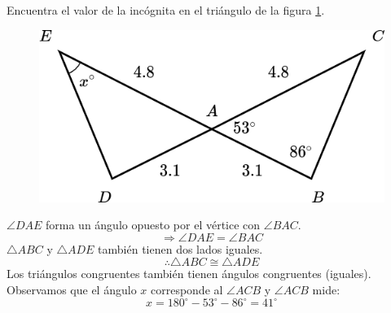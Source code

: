 Encuentra el valor de la incógnita en el triángulo de la figura \ref{fig:angle_triangle_31}.

\begin{minipage}[t][5.5cm][b]{0.3\textwidth}
    \begin{figure}[H]
        \centering
        \includegraphics[width=1\linewidth]{../images/angle_triangle_31.png}
        \caption{}
        \label{fig:angle_triangle_31}
    \end{figure}
\end{minipage}\hfill
\begin{minipage}[t]{0.65\textwidth}
    \begin{solutionbox}{5.5cm}
        $\angle DAE$ forma un ángulo opuesto por el vértice con $\angle BAC$.
        \[\Rightarrow \angle DAE = \angle BAC \]
        $\triangle ABC$ y $\triangle ADE$ también tienen dos lados iguales.
        \[\therefore \triangle ABC \cong \triangle ADE\]
        Los triángulos congruentes también tienen ángulos congruentes (iguales).
        Observamos que el ángulo $x$ corresponde al $\angle ACB$ y
        $\angle ACB$ mide:
        \[x=180^\circ-53^\circ-86^\circ=41^\circ\]
    \end{solutionbox}
\end{minipage}
